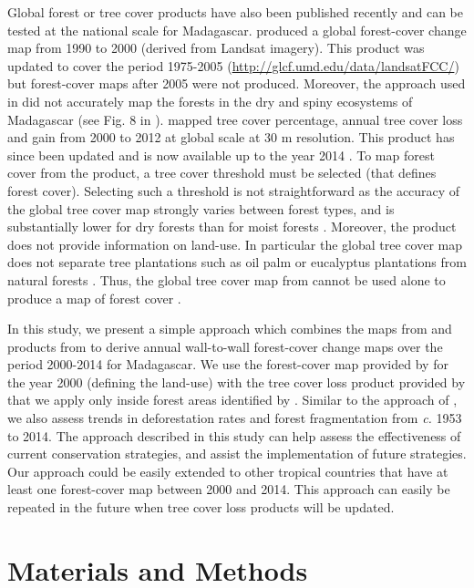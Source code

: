 \documentclass[essd, classical]{copernicus}
\begin{document}
Global forest or tree cover products have also been published recently
and can be tested at the national scale for
Madagascar. \citet{Kim2014} produced a global forest-cover change map
from 1990 to 2000 (derived from Landsat imagery). This product was
updated to cover the period 1975-2005
(\url{http://glcf.umd.edu/data/landsatFCC/}) but forest-cover maps
after 2005 were not produced. Moreover, the approach used in
\citet{Kim2014} did not accurately map the forests in the dry and
spiny ecosystems of Madagascar (see Fig. 8 in \citet{Kim2014}).
\citet{Hansen2013} mapped tree cover percentage, annual tree cover
loss and gain from 2000 to 2012 at global scale at 30 m
resolution. This product has since been updated and is now available
up to the year 2014 \citep{Hansen2013}. To map forest cover from the
\citet{Hansen2013} product, a tree cover threshold must be selected
(that defines forest cover). Selecting such a threshold is not
straightforward as the accuracy of the global tree cover map strongly
varies between forest types, and is substantially lower for dry
forests than for moist forests \citep{Bastin2017}. Moreover, the
\citet{Hansen2013} product does not provide information on
land-use. In particular the global tree cover map does not separate
tree plantations such as oil palm or eucalyptus plantations from
natural forests \citep{Tropek2014}. Thus, the global tree cover map
from \citet{Hansen2013} cannot be used alone to produce a map of
forest cover \citep{Tyukavina2017}.

In this study, we present a simple approach which combines the maps
from \citet{Harper2007} and products from \citet{Hansen2013} to derive
annual wall-to-wall forest-cover change maps over the period 2000-2014
for Madagascar. We use the forest-cover map provided by
\citet{Harper2007} for the year 2000 (defining the land-use) with the
tree cover loss product provided by \citet{Hansen2013} that we apply
only inside forest areas identified by \citet{Harper2007}. Similar to
the approach of \citet{Harper2007}, we also assess trends in
deforestation rates and forest fragmentation from \emph{c.} 1953 to 2014. The
approach described in this study can help assess the effectiveness of
current conservation strategies, and assist the implementation of
future strategies. Our approach could be easily extended to other
tropical countries that have at least one forest-cover map between
2000 and 2014. This approach can easily be repeated in the future when
tree cover loss products will be updated.

\section{Materials and Methods}
\label{materials-and-methods}
\end{document}
